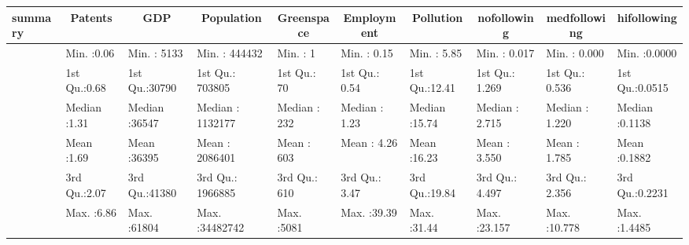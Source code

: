 \begin{table}[!tbp]
\begin{center}
\begin{tabular}{llllllllll}
\hline\hline
\multicolumn{1}{l}{summary}&\multicolumn{1}{c}{   Patents}&\multicolumn{1}{c}{     GDP}&\multicolumn{1}{c}{  Population}&\multicolumn{1}{c}{  Greenspace}&\multicolumn{1}{c}{  Employment}&\multicolumn{1}{c}{  Pollution}&\multicolumn{1}{c}{ nofollowing}&\multicolumn{1}{c}{ medfollowing}&\multicolumn{1}{c}{ hifollowing}\tabularnewline
\hline
&Min.   :0.06  &Min.   : 5133  &Min.   :  444432  &Min.   :   1  &Min.   : 0.15  &Min.   : 5.85  &Min.   : 0.017  &Min.   : 0.000  &Min.   :0.0000  \tabularnewline
&1st Qu.:0.68  &1st Qu.:30790  &1st Qu.:  703805  &1st Qu.:  70  &1st Qu.: 0.54  &1st Qu.:12.41  &1st Qu.: 1.269  &1st Qu.: 0.536  &1st Qu.:0.0515  \tabularnewline
&Median :1.31  &Median :36547  &Median : 1132177  &Median : 232  &Median : 1.23  &Median :15.74  &Median : 2.715  &Median : 1.220  &Median :0.1138  \tabularnewline
&Mean   :1.69  &Mean   :36395  &Mean   : 2086401  &Mean   : 603  &Mean   : 4.26  &Mean   :16.23  &Mean   : 3.550  &Mean   : 1.785  &Mean   :0.1882  \tabularnewline
&3rd Qu.:2.07  &3rd Qu.:41380  &3rd Qu.: 1966885  &3rd Qu.: 610  &3rd Qu.: 3.47  &3rd Qu.:19.84  &3rd Qu.: 4.497  &3rd Qu.: 2.356  &3rd Qu.:0.2231  \tabularnewline
&Max.   :6.86  &Max.   :61804  &Max.   :34482742  &Max.   :5081  &Max.   :39.39  &Max.   :31.44  &Max.   :23.157  &Max.   :10.778  &Max.   :1.4485  \tabularnewline
\hline
\end{tabular}\end{center}

\end{table}
